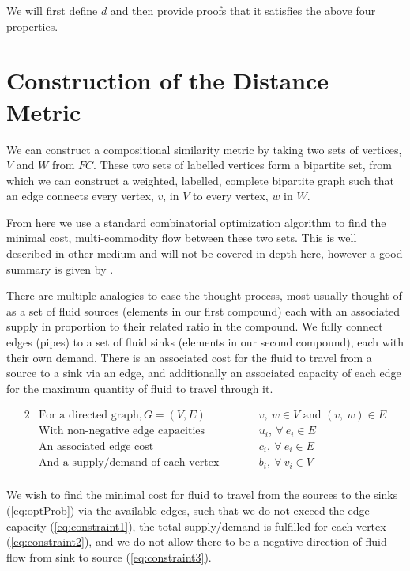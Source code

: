 \documentclass{article}
\begin{document}
We will first define $d$ and then provide proofs that it satisfies the above four properties.

\section{Construction of the Distance Metric}
We can construct a compositional similarity metric by taking two sets of vertices, $V$ and $W$ from $FC$. These two sets of labelled vertices form a bipartite set, from which we can construct a weighted, labelled, complete bipartite graph such that an edge connects every vertex, $v$, in $V$ to every vertex, $w$ in $W$.

From here we use a standard combinatorial optimization algorithm to find the minimal cost, multi-commodity flow between these two sets. This is well described in other medium and will not be covered in depth here, however a good summary is given by \cite{GoogFlowSummary}.

There are multiple analogies to ease the thought process, most usually thought of as a set of fluid sources (elements in our first compound) each with an associated supply in proportion to their related ratio in the compound. We fully connect edges (pipes) to a set of fluid sinks (elements in our second compound), each with their own demand. There is an associated cost for the fluid to travel from a source to a sink via an edge, and additionally an associated capacity of each edge for the maximum quantity of fluid to travel through it.

\begin{alignat*}{2}
   &\text{For a directed graph}, G = (V, E) &\qquad & v,\ w \in V \text{ and } (v,\ w) \in E \\
   &\text{With non-negative edge capacities} &   & u_i,\ \forall\ e_i \in E \\
   &\text{An associated edge cost} &   & c_i,\ \forall\ e_i \in E \\
   &\text{And a supply/demand of each vertex} &   & b_i,\ \forall\ v_i \in V \\
\end{alignat*}

We wish to find the minimal cost for fluid to travel from the sources to the sinks (\ref{eq:optProb}) via the available edges, such that we do not exceed the edge capacity (\ref{eq:constraint1}), the total supply/demand is fulfilled for each vertex (\ref{eq:constraint2}), and we do not allow there to be a negative direction of fluid flow from sink to source (\ref{eq:constraint3}).
\end{document}

